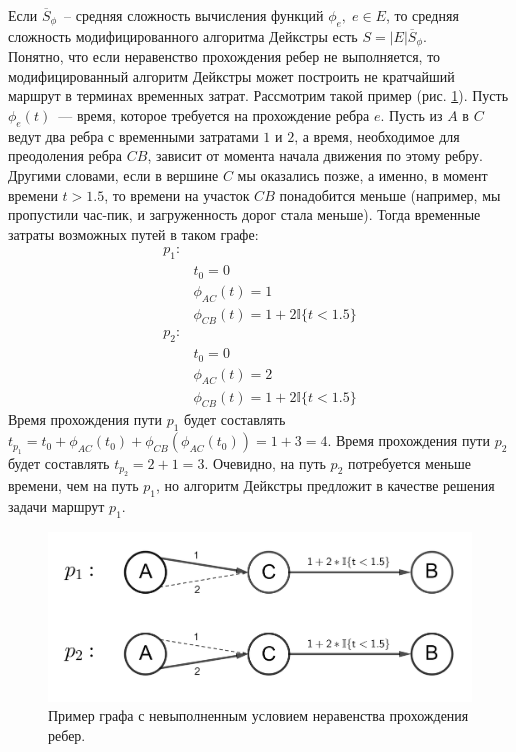 \documentclass[12pt, a4paper]{article}
\begin{document}
	Если $\overline S_{\phi}$~-- средняя сложность вычисления функций $\phi_e, \; e \in E$, то средняя сложность модифицированного алгоритма Дейкстры есть $S = |E|\overline S_{\phi}.$\\
	
	Понятно, что если неравенство прохождения ребер не выполняется, то модифицированный алгоритм Дейкстры может построить не кратчайший маршрут в терминах временных затрат. Рассмотрим такой пример (рис. \ref{ris:deikstra}). Пусть $\phi_e(t)$~--- время, которое требуется на прохождение ребра $e$. Пусть из $A$ в $C$ ведут два ребра с временными затратами $1$ и $2$, а время, необходимое для преодоления ребра $CB$, зависит от момента начала движения по этому ребру. Другими словами, если в вершине $C$ мы оказались позже, а именно, в момент времени $t > 1.5$, то времени на участок $CB$ понадобится меньше (например, мы пропустили час-пик, и загруженность дорог стала меньше). Тогда временные затраты возможных путей в таком графе:
	\begin{align*}
		p_1: & \\
		& t_0 = 0 \\
		& \phi_{AC}(t) = 1  \\
		& \phi_{CB}(t) = 1 + 2 \mathbb{I} \{t < 1.5\} \\
		p_2: & \\
		& t_0 = 0 \\
		& \phi_{AC}(t) = 2  \\
		& \phi_{CB}(t) = 1 + 2 \mathbb{I} \{t < 1.5\} 
	\end{align*}
	Время прохождения пути $p_1$ будет составлять $t_{p_1} = t_0 + \phi_{AC}(t_0) + \phi_{CB}(\phi_{AC}(t_0)) = 1 + 3 = 4 $. Время прохождения пути $p_2$ будет составлять $t_{p_2} = 2 + 1 = 3 $. Очевидно, на путь $p_2$ потребуется меньше времени, чем на путь $p_1$, но алгоритм Дейкстры предложит в качестве решения задачи маршрут $p_1$.
	
	\begin{figure}[H]
		\centering
		\includegraphics[scale=0.2]{graph_2.png}
		\caption{Пример графа с невыполненным условием неравенства прохождения ребер.}
		\label{ris:deikstra}
	\end{figure}
	
\end{document}
